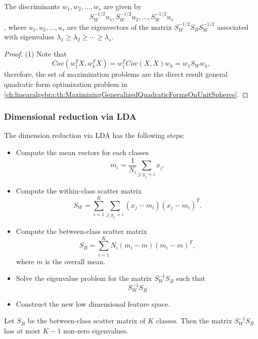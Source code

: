 \begin{refsection}
\begin{theorem}
The discriminants $w_1,w_2,...,w_s$	are given by $$S_W^{-1/2}u_1,S_W^{-1/2}u_2,...,S_W^{-1/2}u_s$$, where $u_1,u_2,...,u_s$ are the eigenvectors of the matrix $S_W^{-1/2}S_BS_W^{-1/2}$ associated with eigenvalues $\lambda_1\geq \lambda_2 \geq \cdots \geq \lambda_s$.
\end{theorem}
\begin{proof}
(1) Note that $$Cov(w_1^TX,w_k^TX) = w_1^TCov(X,X)w_k = w_1S_Ww_k,$$
therefore, the set of maximization problems are the direct result general quadratic form optimization problem in \autoref{ch:linearalgebra:th:MaximizingGeneralizedQuadraticFormsOnUnitSpheres}.
\end{proof}


\subsubsection{Dimensional reduction via LDA}

\begin{method}
	The dimension reduction via LDA has the following steps:
	\begin{itemize}
		\item Compute the mean vectors for each classes
		$$m_i = \frac{1}{N_i}\sum_{j:y_j=i} x_j.$$
		\item Compute the within-class scatter matrix
		$$S_W = \sum_{i=1}^K\sum_{j:y_j=i}  (x_j - m_i)(x_j - m_i)^T.$$
		\item Compute the between-class scatter matrix
		$$S_B = \sum_{i=1}^K N_i (m_i - m)(m_i - m)^T,$$
		where $m$ is the overall mean.
		\item Solve the eigenvalue problem for the matrix $S_W^{-1}S_B$ such that
		$$S_W^{-1}S_B$$
		\item Construct the new low dimensional feature space.
		
	\end{itemize}	
\end{method}


\begin{remark}
Let $S_B$ be the between-class scatter matrix of $K$ classes. Then the matrix $S_W^{-1}S_B$ has at most $K-1$ non-zero eigenvalues.


\end{remark}
\end{refsection}
